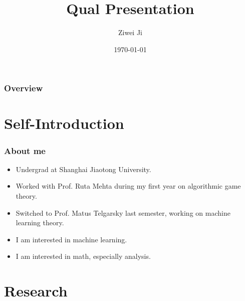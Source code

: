 \documentclass{beamer}
\title[Qual Presentation]{Qual Presentation} %
\author{Ziwei Ji} %
\institute[UIUC] %
{
University of Illinois at Urbana-Champaign \\ %
\medskip
\textit{ziweiji2@illinois.edu} %
}
\date{\today} %
\begin{document}
\begin{frame}
\titlepage %
\end{frame}

\begin{frame}
\frametitle{Overview} %
\tableofcontents %
\end{frame}


\section{Self-Introduction}

\begin{frame}
\frametitle{About me}
\begin{itemize}
    \item Undergrad at Shanghai Jiaotong University.
    \item Worked with Prof. Ruta Mehta during my first year on algorithmic game theory.
    \item Switched to Prof. Matus Telgarsky last semester, working on machine learning theory.
\end{itemize}
\begin{itemize}
    \item I am interested in machine learning.
    \item I am interested in math, especially analysis.
\end{itemize}
\end{frame}


\section{Research}
\end{document}
